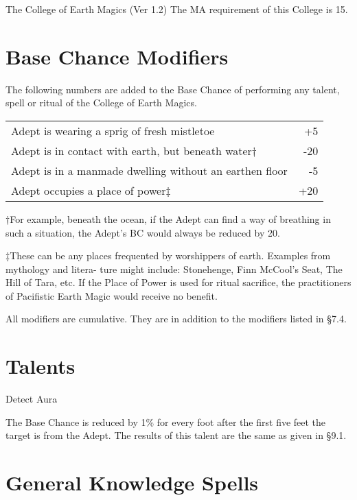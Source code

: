 \begin{Chapter}{The College of Earth Magics (Ver 1.2)}
The MA requirement of this College is 15. 


\section{Base Chance Modifiers}

The following numbers are added to the Base Chance of performing any
talent, spell or ritual of the College of Earth Magics.

\begin{tabularx}{\columnwidth}{Xr}
Adept is wearing a sprig of fresh mistletoe & +5 \\
Adept is in contact with earth, but beneath water† & -20 \\
Adept is in a manmade dwelling without an earthen floor & -5 \\
Adept occupies a place of power‡	& +20 \\
\end{tabularx}

†For example, beneath the ocean, if the Adept can find a way of
breathing in such a situation, the Adept’s BC would always be reduced
by 20.

‡These can be any places frequented by worshippers of earth. Examples
from mythology and litera- ture might include: Stonehenge, Finn
McCool’s Seat, The Hill of Tara, etc. If the Place of Power is used
for ritual sacrifice, the practitioners of Pacifistic Earth Magic
would receive no benefit.

All modifiers are cumulative. They are in addition to the modifiers
listed in §7.4.

\section{Talents}

\begin{talent}[T-1]{Detect Aura}

\begin{effects}
The Base Chance is reduced by 1\% for every foot after the first five
feet the target is from the Adept. The results of this talent are the
same as given in §9.1.
\end{effects}
\end{talent}

\section{General Knowledge Spells}


\end{Chapter}
